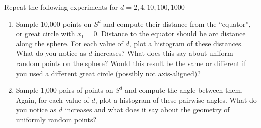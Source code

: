 \documentclass[11pt]{article}
\begin{document}
\begin{enumerate}
  Repeat the following experiments for $d = 2, 4, 10, 100, 1000$
  \begin{enumerate}
  \item Sample 10,000 points on $S^d$ and compute their distance from the
    ``equator'', or great circle with $x_1 = 0$. Distance to the equator should
    be arc distance along the sphere. For each value of $d$, plot a histogram of
    these distances. What do you notice as $d$ increases? What does this say
    about uniform random points on the sphere? Would this result be the same or
    different if you used a different great circle (possibly not axis-aligned)?

  \item Sample 1,000 pairs of points on $S^d$ and compute the angle between
    them. Again, for each value of $d$, plot a histogram of these pairwise
    angles. What do you notice as $d$ increases and what does it say about the
    geometry of uniformly random points?
  \end{enumerate}
  
\end{enumerate}
\end{document}
